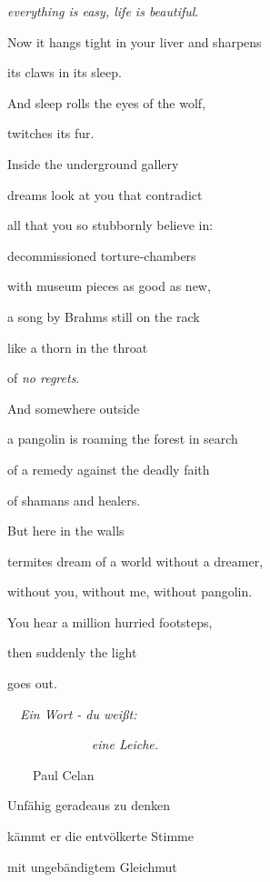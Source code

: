 \emph{everything is easy, life is beautiful}.

Now it hangs tight in your liver and sharpens

its claws in its sleep.

And sleep rolls the eyes of the wolf,

twitches its fur.


\bigskip

Inside the underground gallery 

dreams look at you that contradict 

all that you so stubbornly believe in:

decommissioned torture-chambers

with museum pieces as good as new,

a song by Brahms still on the rack

like a thorn in the throat

of \emph{no regrets}.


\bigskip

And somewhere outside

a pangolin is roaming the forest in search 

of a remedy against the deadly faith

of shamans and healers.


\bigskip

But here in the walls

termites dream of a world without a dreamer,

without you, without me, without pangolin.


\bigskip

You hear a million hurried footsteps,

then suddenly the light

goes out.


\bigskip


\bigskip


\bigskip



\bigskip

\ \  \emph{Ein Wort - du weißt:}

\emph{\ \ \ \ \ \ \ \ \ \ \ \ }\ \emph{eine Leiche.}

\ \ \ \  Paul Celan


\bigskip

Unfähig geradeaus zu denken

kämmt er die entvölkerte Stimme

mit ungebändigtem Gleichmut 

